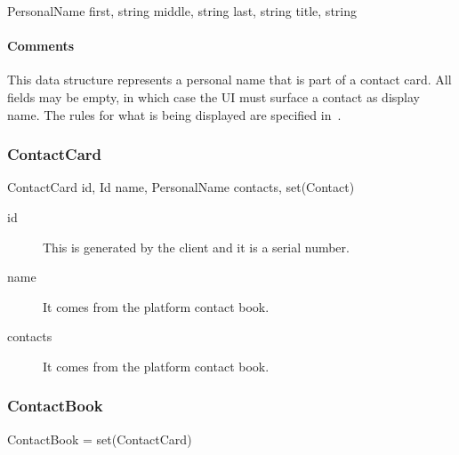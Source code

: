 \documentclass[a4paper,10pt]{article}
\begin{document}
\begin{verbbox}
PersonalName
{
  first, string
  middle, string
  last, string
  title, string
}
\end{verbbox}
\begin{center}
\theverbbox
\end{center}

\begin{inparaitem}[ ]
 \item \infrastructure
\end{inparaitem}

\paragraph*{Comments}
This data structure represents a personal name that is part of a contact card. All fields may be empty, in which case the UI must surface a contact as display name. The rules 
for what is being displayed are specified in~\cite{flow_spec}.

\subsubsection{ContactCard}

\begin{verbbox}
ContactCard
{
  id, Id
  name, PersonalName
  contacts, set(Contact)
}
\end{verbbox}
\begin{center}
\theverbbox
\end{center}

\begin{inparaitem}[ ]
 \item \infrastructure
\end{inparaitem}

\SpecialItem
\begin{description}
 \item[id] This is generated by the client and it is a serial number.
 \item[name] It comes from the platform contact book.
 \item[contacts] It comes from the platform contact book.
\end{description}

\subsubsection{ContactBook}

\begin{verbbox}
ContactBook = set(ContactCard)
\end{verbbox}
\begin{center}
\theverbbox
\end{center}
\end{document}
